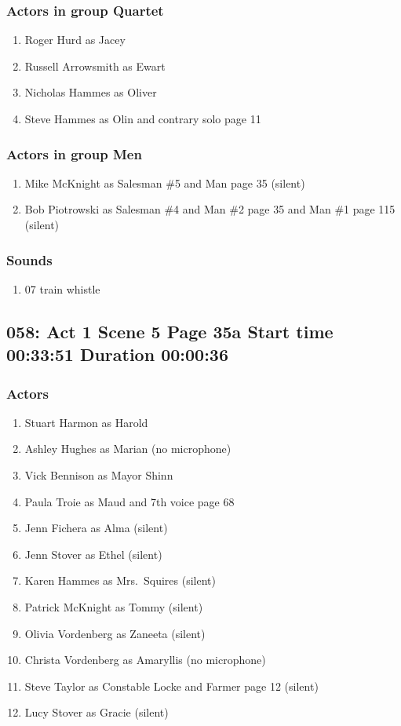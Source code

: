 \subsubsection{Actors in group Quartet}
\begin{enumerate}
\item Roger Hurd as Jacey
\item Russell Arrowsmith as Ewart
\item Nicholas Hammes as Oliver
\item Steve Hammes as Olin and contrary solo page 11
\end{enumerate}
\subsubsection{Actors in group Men}
\begin{enumerate}
\item Mike McKnight as Salesman \#5 and Man page 35 (silent)
\item Bob Piotrowski as Salesman \#4 and Man \#2 page 35 and Man \#1 page 115 (silent)
\end{enumerate}

\subsubsection{Sounds}
\begin{enumerate}
\item 07 train whistle
\end{enumerate}
\subsection{058: Act 1 Scene 5 Page 35a Start time 00:33:51 Duration 00:00:36}

\subsubsection{Actors}
\begin{enumerate}
\item Stuart Harmon as Harold
\item Ashley Hughes as Marian (no microphone)
\item Vick Bennison as Mayor Shinn
\item Paula Troie as Maud and 7th voice page 68
\item Jenn Fichera as Alma (silent)
\item Jenn Stover as Ethel (silent)
\item Karen Hammes as Mrs.~Squires (silent)
\item Patrick McKnight as Tommy (silent)
\item Olivia Vordenberg as Zaneeta (silent)
\item Christa Vordenberg as Amaryllis (no microphone)
\item Steve Taylor as Constable Locke and Farmer page 12 (silent)
\item Lucy Stover as Gracie (silent)
\end{enumerate}
